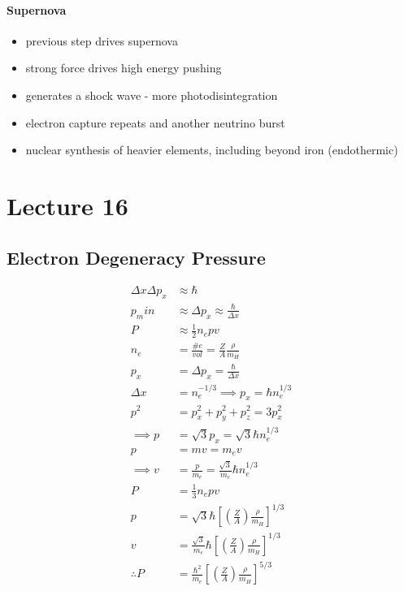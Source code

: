 \documentclass[a4paper,11pt,normalem]{article}
\begin{document}
\paragraph{Supernova}

\begin{itemize}
    \item previous step drives supernova
    \item strong force drives high energy pushing
    \item generates a shock wave - more photodisintegration
    \item electron capture repeats and another neutrino burst
    \item nuclear synthesis of heavier elements, including beyond iron (endothermic)
\end{itemize}

\section{Lecture 16}

\subsection{Electron Degeneracy Pressure}

\begin{align*}
    \Delta x\Delta p_x &\approx \hbar \\
    p_min &\approx \Delta p_x \approx \frac{\hbar}{\Delta x} \\
    P &\approx \frac{1}{2}n_e pv \\
    n_e &= \frac{\# e}{vol} = \frac{Z}{A} \frac{\rho}{m_H} \\
    p_x &= \Delta p_x = \frac{\hbar}{\Delta x} \\
    \Delta x &= n_e^{-1/3} \implies p_x = \hbar n_e^{1/3} \\
    p^2 &= p_x^2 + p_y^2 + p_z^2 = 3p_x^2 \\
    \implies p &= \sqrt{3}p_x = \sqrt{3}\hbar n_e^{1/3} \\
    p &= mv = m_e v \\
    \implies v &= \frac{p}{m_e} = \frac{\sqrt{3}}{m_e}\hbar n_e^{1/3} \\
    P &= \frac{1}{3}n_e pv \\
    p &= \sqrt{3}\hbar \left[\left(\frac{Z}{A}\right)\frac{\rho}{m_H}\right]^{1/3} \\
    v &= \frac{\sqrt{3}}{m_e}\hbar \left[\left(\frac{Z}{A}\right) \frac{\rho}{m_H}\right]^{1/3} \\
    \therefore P &= \frac{\hbar^2}{m_e}\left[\left(\frac{Z}{A}\right) \frac{\rho}{m_H}\right]^{5/3}
\end{align*}
\end{document}
